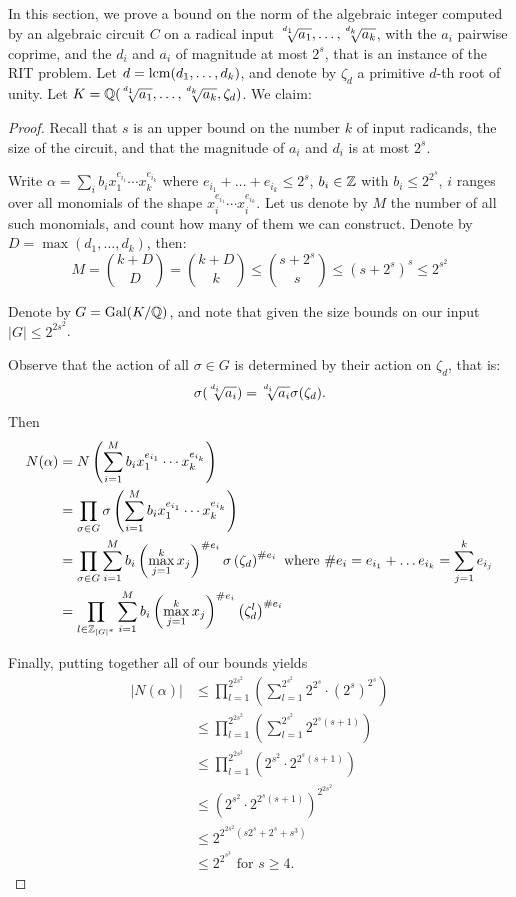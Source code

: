 In this section, we prove a bound on the norm of the algebraic integer computed by an algebraic circuit $C$ on a radical input $\mysqrt{d_1}{a_1},\ldots,\mysqrt{d_k}{a_k}$, with the $a_i$ pairwise coprime, and the $d_i$ and $a_i$ of magnitude at most $2^s$, that is an instance of the RIT problem.
Let $d=\operatorname{lcm}(d_1,\ldots,d_k)$, and denote by $\zeta_d$ a primitive $d$-th root of unity. Let  $K = \QQ(\mysqrt{d_1}{a_1},\ldots,\mysqrt{d_k}{a_k}, \zeta_d)$. We claim:


\boundnorm*

\begin{proof}
Recall that $s$ is an upper bound on the number $k$ of input radicands, the size of the circuit, and that the magnitude of $a_i$ and $d_i$ is at most $2^s$. 

Write $\alpha = \sum_{i} b_i x_1^{e_{i_1}} \cdots x_k^{e_{i_k}}$ where
$e_{i_1} + \ldots + e_{i_k} \leq 2^s $, $b_i \in \mathbb{Z}$ with $b_i\leq 2^{2^s}$,
$i$ ranges over all monomials of the shape $x_i^{e_{i_1}}\cdots x_i^{e_{i_k}}$. Let us denote by $M$ the number of all such monomials, and count how many of them we can construct. Denote by $D = \max (d_1,\ldots,d_k)$, then:
\[ M = \binom{k+D}{D} = \binom{k + D}{k} \leq  \binom{s + 2^s}{s}
\leq (s + 2^s)^s \leq 2^{s^2}  \]

Denote by $G = \operatorname{Gal}(K/\mathbb{Q})$, and
note that given the size bounds on our input $|G| \leq 2^{2s^2}$.

 Observe that the action of all $\sigma\in G$ is determined by their action on $\zeta_d$, that is:
\[ \sigma(\mysqrt{d_i}{a_i}) = \mysqrt{d_i}{a_i}\sigma(\zeta_d).\]
Then
\begin{align*}
    N(\alpha)
    &= N\left(\sum_{i = 1}^M b_i x_1^{e_{i_1}} \cdots x_k^{e_{i_k}} \right) \\
    &= \prod_{\sigma\in G} \sigma\left(\sum_{i = 1}^M b_i x_1^{e_{i_1}} \cdots x_k^{e_{i_k}} \right) \\
    &= \prod_{\sigma\in G} \sum_{i=1}^M b_i \left(\max_{j=1}^k x_j \right)^{\#e_i}\sigma \left(\zeta_d \right)^{\#e_i}
    \text{ where } \#e_i = e_{i_1} + \ldots e_{i_k} = \sum_{j=1}^k e_{i_j} \\
    &= \prod_{l\in \mathbb{Z}_{|G|^*}} \sum_{i=1}^M b_i \left(\max_{j=1}^k x_j\right)^{\#e_i} \left(\zeta_d^l\right)^{\#e_i}
\end{align*}

Finally, putting together all of our bounds
yields
\begin{align*}
    |N(\alpha)|
    &\leq \prod_{l=1}^{2^{2s^2} } \left( \sum_{l=1}^{2^{s^2}} 2^{2^s} \cdot (2^s)^{2^s} \right) \\
    &\leq \prod_{l=1}^{2^{2s^2} } \left( \sum_{l=1}^{2^{s^2}} 2^{2^s (s+1)}\right) \\
    &\leq \prod_{l=1}^{2^{2s^2} } \left( 2^{s^2} \cdot 2^{2^s (s+1)} \right) \\
    &\leq \left( 2^{s^2} \cdot 2^{2^s (s+1)} \right) ^ {2^{2s^2}} \\
    &\leq 2^{2^{2s^2} (s2^s + 2^s + s^3)} \\
    &\leq 2^{2^{s^3}} \text{ for } s \geq 4.
\end{align*}
\end{proof}
